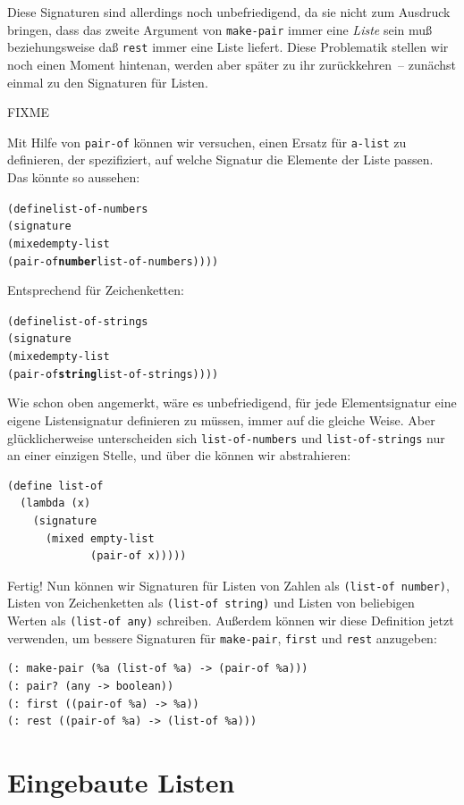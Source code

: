 Diese Signaturen sind allerdings noch unbefriedigend, da sie nicht zum
Ausdruck bringen, dass das zweite Argument von \texttt{make-pair} immer
eine \emph{Liste} sein muß beziehungsweise daß \texttt{rest} immer
eine Liste liefert.  Diese Problematik stellen wir noch einen Moment
hintenan, werden aber später zu ihr zurückkehren~-- zunächst einmal zu
den Signaturen für Listen.

FIXME

Mit Hilfe von \texttt{pair-of} können wir versuchen, einen Ersatz für
\texttt{a-list} zu definieren, der spezifiziert, auf welche Signatur
die Elemente der Liste passen.  Das könnte so aussehen:
%
\begin{alltt}
(define list-of-numbers
  (signature
    (mixed empty-list
           (pair-of \textbf{number} list-of-numbers))))
\end{alltt}
%
Entsprechend für Zeichenketten:
%
\begin{alltt}
(define list-of-strings
  (signature
    (mixed empty-list
           (pair-of \textbf{string} list-of-strings))))
\end{alltt}
%
Wie schon oben angemerkt, wäre es unbefriedigend, für jede Elementsignatur eine
eigene Listensignatur definieren zu müssen, immer auf die gleiche
Weise.  Aber glücklicherweise unterscheiden sich
\texttt{list-of-numbers} und \texttt{list-of-strings} nur an einer
einzigen Stelle, und über die können wir abstrahieren:
%
\begin{verbatim}
(define list-of
  (lambda (x)
    (signature
      (mixed empty-list
             (pair-of x)))))
\end{verbatim}
%
Fertig!  Nun können wir Signaturen für Listen von Zahlen als
\texttt{(list-of number)}, Listen von Zeichenketten als
\texttt{(list-of string)} und Listen von beliebigen Werten als
\texttt{(list-of any)} schreiben.  Außerdem können wir diese
Definition jetzt verwenden, um bessere Signaturen für
\texttt{make-pair}, \texttt{first} und \texttt{rest} anzugeben:
%
\begin{verbatim}
(: make-pair (%a (list-of %a) -> (pair-of %a)))
(: pair? (any -> boolean))
(: first ((pair-of %a) -> %a))
(: rest ((pair-of %a) -> (list-of %a)))
\end{verbatim}
%

\section{Eingebaute Listen}

